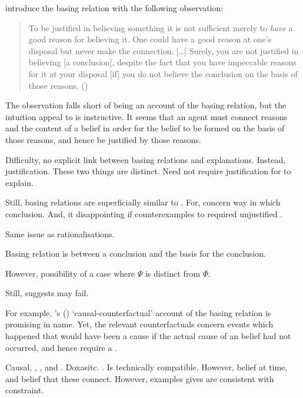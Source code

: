 \begin{note}
  \citeauthor{Pollock:1999tm} introduce the basing relation with the following observation:
  \begin{quote}
    To be justified in believing something it is not sufficient merely to \emph{have} a good reason for believing it.
    One could have a good reason at one's disposal but never make the connection.
    [\dots]
    Surely, you are not justified in believing [a conclusion], despite the fact that you have impeccable reasons for it at your disposal [if] you do not believe the conclusion on the basis of those reasons.%
    \mbox{}\hfill\mbox{(\citeyear[35]{Pollock:1999tm})}
  \end{quote}
  The observation falls short of being an account of the basing relation, but the intuition \citeauthor{Pollock:1999tm} appeal to is instructive.
  It seems that an agent must connect reasons and the content of a belief in order for the belief to be formed on the basis of those reasons, and hence be justified by those reasons.
\end{note}

\begin{note}
  Difficulty, no explicit link between basing relations and explanations.
  Instead, justification.
  These two things are distinct.
  Need not require justification for \ros{} to explain.

  Still, basing relations are superficially similar to .
  For, concern way in which conclusion.
  And, it disappointing if counterexamples to \issueInclusion{} required unjustified .
\end{note}

\begin{note}
  Same issue as rationalisations.

  Basing relation is between a conclusion and the basis for the conclusion.

  However, possibility of a case where \(\Psi\) is distinct from \(\Phi\).
\end{note}

\begin{note}
  Still, suggests \issueInclusion{} may fail.

  For example, \citeauthor{Swain:1981wd}'s (\citeyear{Swain:1981wd}) `causal-counterfactual' account of the basing relation is promising in name.
  Yet, the relevant counterfactuals concern events which happened that would have been a cause if the actual cause of an \agents{} belief had not occurred, and hence require a .

  Causal, \textcite{Moser:1989tv}, \textcite{Ye:2020ux}, and \citeauthor{Turri:2011aa}.
  Doxasitc.
  \textcite{Tolliver:1982us}.
  Is technically compatible.
  However, belief at time, and belief that these connect.
  However, examples \citeauthor{Tolliver:1982us} gives are consistent with constraint.
\end{note}

